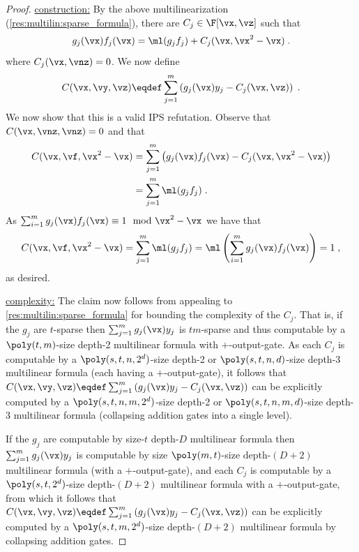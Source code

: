 \documentclass[11pt]{article}
\numberwithin{equation}{section}
\theoremstyle{definition}
\theoremstyle{plain}
\begin{document}
\begin{proof}
        \uline{construction:}
        By the above multilinearization (\autoref{res:multilin:sparse_formula}), there are $C_j\in\F[\vx,\vz]$ such that
        \[
                g_j(\vx)f_j(\vx)=\ml(g_jf_j)+C_j(\vx,\vx^2-\vx)
                \;.
        \]
        where $C_j(\vx,\vnz)=0$. We now define
        \[
                C(\vx,\vy,\vz)\eqdef \sum_{j=1}^m \left (g_j(\vx)y_j - C_j(\vx,\vz)\right)
                \;.
        \]
        We now show that this is a valid IPS refutation. Observe that $C(\vx,\vnz,\vnz)=0$ and that
        \begin{align*}
                C(\vx,\vf,\vx^2-\vx)
                &=\sum_{j=1}^m \left (g_j(\vx)f_j(\vx) - C_j(\vx,\vx^2-\vx)\right)\\\
                &=\sum_{j=1}^m \ml(g_jf_j)
                \;.
        \end{align*}
        As $\sum_{i=1}^m g_j(\vx)f_j(\vx)\equiv 1\mod \vx^2-\vx$ we have that
        \[
                C(\vx,\vf,\vx^2-\vx)
                =\sum_{j=1}^m \ml(g_jf_j)
                =\ml\left(\sum_{i=1}^m g_j(\vx)f_j(\vx)\right)
                =1
                \;,
        \]
        as desired.

%


        \uline{complexity:}
        The claim now follows from appealing to \autoref{res:multilin:sparse_formula} for bounding the complexity of the $C_j$.  That is, if the $g_j$ are $t$-sparse then $\sum_{j=1}^m g_j(\vx)y_j$ is $tm$-sparse and thus computable by a $\poly(t,m)$-size depth-2 multilinear formula with $+$-output-gate. As each $C_j$ is computable by a $\poly(s,t,n,2^d)$-size depth-2 or $\poly(s,t,n,d)$-size depth-3 multilinear formula (each having a $+$-output-gate), it follows that $C(\vx,\vy,\vz)\eqdef \sum_{j=1}^m \left (g_j(\vx)y_j - C_j(\vx,\vz)\right)$ can be explicitly computed by a $\poly(s,t,n,m,2^d)$-size depth-2 or $\poly(s,t,n,m,d)$-size depth-3 multilinear formula (collapsing addition gates into a single level).

        If the $g_j$ are computable by size-$t$ depth-$D$ multilinear formula then $\sum_{j=1}^m g_j(\vx)y_j$ is computable by size $\poly(m,t)$-size depth-$(D+2)$ multilinear formula (with a $+$-output-gate), and each $C_j$ is computable by a $\poly(s,t,2^d)$-size depth-$(D+2)$ multilinear formula with a $+$-output-gate, from which it follows that $C(\vx,\vy,\vz)\eqdef \sum_{j=1}^m \left (g_j(\vx)y_j - C_j(\vx,\vz)\right)$ can be explicitly computed by a $\poly(s,t,m,2^d)$-size depth-$(D+2)$ multilinear formula by collapsing addition gates.
\end{proof}
\end{document}
